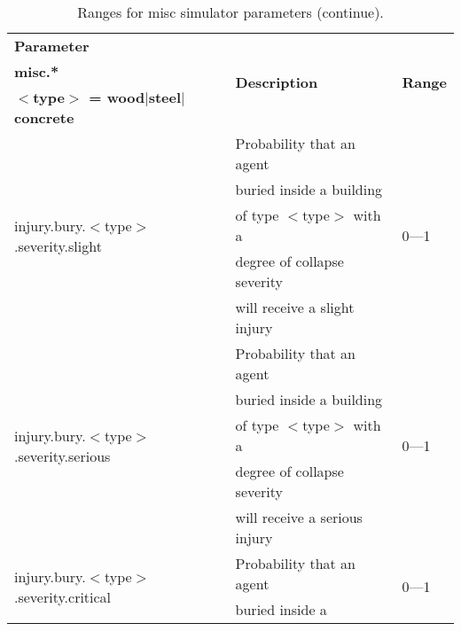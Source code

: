 \documentclass{article}
\begin{document}
\begin{table}[htb]
\caption{Ranges for misc simulator parameters (continue).}
\label{tab:12}
\centering
\begin{tabular}{lll}
  \hline
  \textbf{Parameter}                                        &
  \multirow{3}{*}{\textbf{Description}} & \multirow{3}{*}{\textbf{Range}}\\
  \textbf{misc.*}                                           &
                                        & \\
  \textbf{$<$type$>$ = wood$|$steel$|$concrete}             &
                                        & \\
  \hline
  \multirow{5}{*}{injury.bury.$<$type$>$.severity.slight}   &  Probability that
  an agent                              & \multirow{5}{*}{0---1}\\
                                                            & buried inside a
  building                              & \\
                                                            & of type $<$type$>$
  with a                                & \\
                                                            & degree of collapse
  severity                              & \\
                                                            & will receive a
  slight injury                         & \\
  \hline
  \multirow{5}{*}{injury.bury.$<$type$>$.severity.serious}  &
  Probability that an agent             & \multirow{5}{*}{0---1}\\
                                                            & buried inside a
  building                              & \\
                                                            & of type $<$type$>$
  with a                                & \\
                                                            & degree of collapse
  severity                              & \\
                                                            & will receive a
  serious injury                        & \\
  \hline
  \multirow{5}{*}{injury.bury.$<$type$>$.severity.critical} &  Probability that
  an agent                              & \multirow{5}{*}{0---1}\\
                                                            & buried inside a

\end{tabular}
\end{table}
\end{document}
